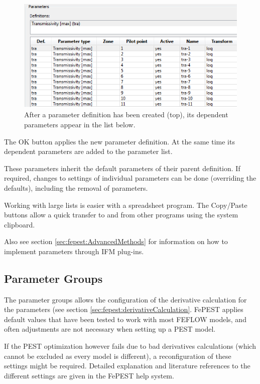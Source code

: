 \begin{figure}
	\center
	\includegraphics[width=\columnwidth]{figureFundamentalSetup/ParameterList.png}
\caption{After a parameter definition has been created (top), its dependent parameters appear in the list below.}
\label{fig:fepest:ParameterList}
\end{figure}

The OK button applies the new parameter definition. At the same time its dependent parameters are added to the parameter list.

These parameters inherit the default parameters of their parent definition. If required, changes to settings of individual parameters can be done (overriding the defaults), including the removal of parameters.

Working with large lists is easier with a spreadsheet program. The Copy/Paste buttons allow a quick transfer to and from other programs using the system clipboard.

Also see section \ref{sec:fepest:AdvancedMethods} for information on how to implement parameters through IFM plug-ins.

\subsection{Parameter Groups}
\label{sec:fepest:parameterGroupsSettings}

The parameter groups allows the configuration of the derivative calculation for the parameters (see section \ref{sec:fepest:derivativeCalculation}. FePEST applies default values that have been tested to work with most FEFLOW models, and often adjustments are not necessary when setting up a PEST model.

If the PEST optimization however fails due to bad derivatives calculations (which cannot be excluded as every model is different), a reconfiguration of these settings might be required. Detailed explanation and literature references to the different settings are given in the FePEST help system.

